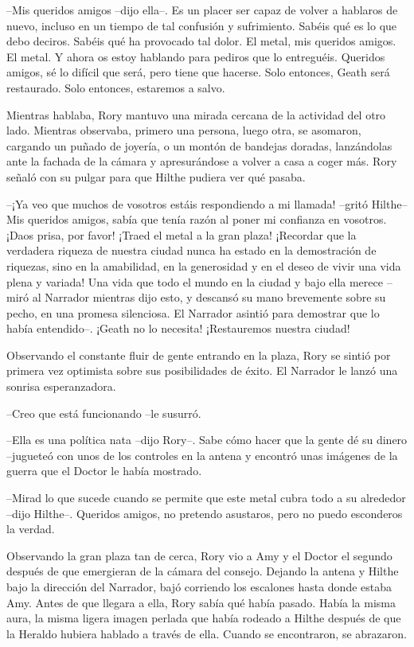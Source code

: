 {--Mis queridos amigos --dijo ella--. Es un placer ser capaz de volver
	a hablaros de nuevo, incluso en un tiempo de tal confusión y
	sufrimiento. Sabéis qué es lo que debo deciros. Sabéis qué ha provocado
	tal dolor. El metal, mis queridos amigos. El metal. Y ahora os estoy
	hablando para pediros que lo entreguéis. Queridos amigos, sé lo difícil
	que será, pero tiene que hacerse. Solo entonces, Geath será restaurado.
Solo entonces, estaremos a salvo.}

{Mientras hablaba, Rory mantuvo una mirada cercana de la actividad del
	otro lado. Mientras observaba, primero una persona, luego otra, se
	asomaron, cargando un puñado de joyería, o un montón de bandejas
	doradas, lanzándolas ante la fachada de la cámara y apresurándose a
	volver a casa a coger más. Rory señaló con su pulgar para que Hilthe
pudiera ver qué pasaba.}

{--¡Ya veo que muchos de vosotros estáis respondiendo a mi llamada!
	--gritó Hilthe-- Mis queridos amigos, sabía que tenía razón al poner mi
	confianza en vosotros. ¡Daos prisa, por favor! ¡Traed el metal a la gran
	plaza! ¡Recordar que la verdadera riqueza de nuestra ciudad nunca ha
	estado en la demostración de riquezas, sino en la amabilidad, en la
	generosidad y en el deseo de vivir una vida plena y variada! Una vida
	que todo el mundo en la ciudad y bajo ella merece --miró al Narrador
	mientras dijo esto, y descansó su mano brevemente sobre su pecho, en una
	promesa silenciosa. El Narrador asintió para demostrar que lo había
entendido--. ¡Geath no lo necesita! ¡Restauremos nuestra ciudad!}

{Observando el constante fluir de gente entrando en la plaza, Rory se
	sintió por primera vez optimista sobre sus posibilidades de éxito. El
Narrador le lanzó una sonrisa esperanzadora.}

{--Creo que está funcionando --le susurró.}

{--Ella es una política nata --dijo Rory--. Sabe cómo hacer que la
	gente dé su dinero --jugueteó con unos de los controles en la antena y
encontró unas imágenes de la guerra que el Doctor le había mostrado.}

{--Mirad lo que sucede cuando se permite que este metal cubra todo a
	su alrededor --dijo Hilthe--. Queridos amigos, no pretendo asustaros,
pero no puedo esconderos la verdad.}

{Observando la gran plaza tan de cerca, Rory vio a Amy y el Doctor el
	segundo después de que emergieran de la cámara del consejo. Dejando la
	antena y Hilthe bajo la dirección del Narrador, bajó corriendo los
	escalones hasta donde estaba Amy. Antes de que llegara a ella, Rory
	sabía qué había pasado. Había la misma aura, la misma ligera imagen
	perlada que había rodeado a Hilthe después de que la Heraldo hubiera
hablado a través de ella. Cuando se encontraron, se abrazaron.}

